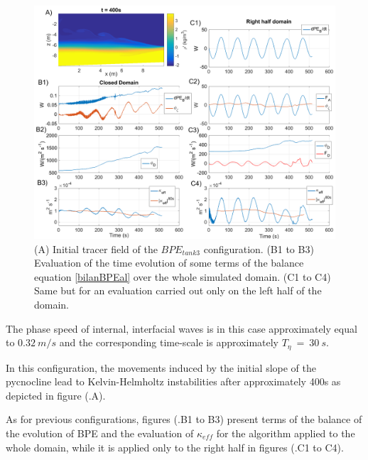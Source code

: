 \begin{figure}[h!]
\includegraphics[width=1.\textwidth]{./CHAP_BPE/Fig_TANK_pycbath.png}
\caption[Initial tracer field and evaluation of $\kappa_{eff}$ for configuration $BPE_{tank3}$]{(A) Initial tracer field of the $BPE_{tank3}$ configuration. (B1 to B3) Evaluation of the time evolution of some terms of the balance equation \ref{bilanBPEal} over the whole simulated domain. (C1 to C4) Same but for an evaluation carried out only on the left half of the domain.}
\label{figCbath}
\end{figure}
The phase speed of internal, interfacial waves is in this case approximately equal to $0.32\ m/s$ and the corresponding time-scale is approximately $T_{\eta}\ =\ 30\ s$.

In this configuration, the movements induced by the initial slope of the pycnocline lead to Kelvin-Helmholtz instabilities after approximately 400s as depicted in figure (.A).

As for previous configurations, figures (.B1 to B3) present terms of the balance of the evolution of BPE and the evaluation of $\kappa_{eff}$ for the algorithm applied to the whole domain, while it is applied only to the right half in figures (.C1 to C4).

